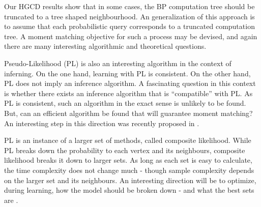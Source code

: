Our HGCD results show that in some cases, the BP computation tree should be truncated to a tree shaped neighbourhood. An generalization of this approach is to assume that each probabilistic query corresponds to a truncated computation tree. A moment matching objective for such a process may be devised, and again there are many interesting algorithmic and theoretical questions.  


Pseudo-Likelihood (PL) is also an interesting algorithm in the context of inferning. On the one hand, learning with PL is consistent. On the other hand, PL does not imply an inference algorithm. A fascinating question in this context is whether there exists an inference algorithm that is ``compatible'' with PL. As PL is consistent, such an algorithm in the exact sense is unlikely to be found.
But, can an efficient algorithm be found that will guarantee moment matching? An interesting
step in this direction was recently proposed in \cite{bertasius2016local}.

PL is an instance of a larger set of methods, called composite likelihood. While PL breaks down the probability to each vertex and its neighbours, composite likelihood breaks it down to larger sets.
As long as each set is easy to calculate, the time complexity does not change much - though sample complexity depends on the larger set and its neighbours.
An interesting direction will be to optimize, during learning, how the model should be broken down - and what the best sets are \cite{dillon2010stochastic}.


